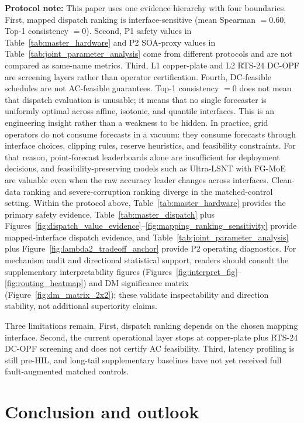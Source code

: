 \documentclass[review,1p,times]{elsarticle}
\begin{document}
\noindent\textbf{Protocol note:} This paper uses one evidence hierarchy with four boundaries. First, mapped dispatch ranking is interface-sensitive (mean Spearman $=0.60$, Top-1 consistency $=0$). Second, P1 safety values in Table~\ref{tab:master_hardware} and P2 SOA-proxy values in Table~\ref{tab:joint_parameter_analysis} come from different protocols and are not compared as same-name metrics. Third, L1 copper-plate and L2 RTS-24 DC-OPF are screening layers rather than operator certification. Fourth, DC-feasible schedules are not AC-feasible guarantees.
Top-1 consistency $=0$ does not mean that dispatch evaluation is unusable; it means that no single forecaster is uniformly optimal across affine, isotonic, and quantile interfaces. This is an engineering insight rather than a weakness to be hidden. In practice, grid operators do not consume forecasts in a vacuum: they consume forecasts through interface choices, clipping rules, reserve heuristics, and feasibility constraints. For that reason, point-forecast leaderboards alone are insufficient for deployment decisions, and feasibility-preserving models such as Ultra-LSNT with FG-MoE are valuable even when the raw accuracy leader changes across interfaces.
Clean-data ranking and severe-corruption ranking diverge in the matched-control setting. Within the protocol above, Table~\ref{tab:master_hardware} provides the primary safety evidence, Table~\ref{tab:master_dispatch} plus Figures~\ref{fig:dispatch_value_evidence}--\ref{fig:mapping_ranking_sensitivity} provide mapped-interface dispatch evidence, and Table~\ref{tab:joint_parameter_analysis} plus Figure~\ref{fig:lambda2_tradeoff_anchor} provide P2 operating diagnostics.
For mechanism audit and directional statistical support, readers should consult the supplementary interpretability figures (Figures~\ref{fig:interpret_fig}--\ref{fig:routing_heatmap}) and DM significance matrix (Figure~\ref{fig:dm_matrix_2x2}); these validate inspectability and direction stability, not additional superiority claims.

Three limitations remain. First, dispatch ranking depends on the chosen mapping interface. Second, the current operational layer stops at copper-plate plus RTS-24 DC-OPF screening and does not certify AC feasibility. Third, latency profiling is still pre-HIL, and long-tail supplementary baselines have not yet received full fault-augmented matched controls.
\section{Conclusion and outlook}
\label{sec:conclusion}
\end{document}
